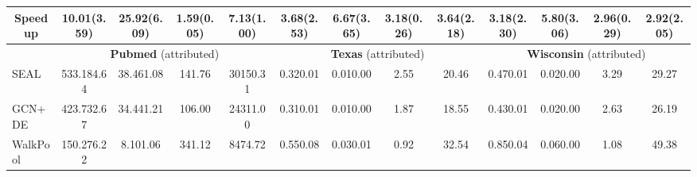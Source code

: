 \documentclass[sigconf, nonacm]{acmart}
\newcommand{\worst}{\cellcolor[rgb]{0.957,0.8,0.8}}
\newcommand{\best}{\cellcolor[rgb]{0.851,0.918,0.827}}
\begin{document}
\begin{table*}[h!]
{\begin{tabular}{l|cccc|cccc|cccc}
\hline
\multicolumn{1}{c}{Speedup} & 10.01(3.59)                                       & 25.92(6.09)                                     & 1.59(0.05)                                 & \multicolumn{1}{c}{7.13(1.00)}              & 3.68(2.53)                                       & 6.67(3.65)                                      & 3.18(0.26)                                & \multicolumn{1}{c}{3.64(2.18)}             & 3.18(2.30)                                        & 5.80(3.06)                                       & 2.96(0.29)                                 & 2.92(2.05)                                   \\ 
\hline
\multicolumn{1}{l|}{}       & \multicolumn{4}{c|}{\textbf{Pubmed }(attributed)}                                                                                                                                              & \multicolumn{4}{c|}{\textbf{Texas }(attributed)}                                                                                                                                            & \multicolumn{4}{c}{\textbf{Wisconsin }(attributed)}                                                                                                                                            \\ 
\hline
SEAL                        & \worst533.18{\scriptsize4.64}     & \worst38.46{\scriptsize1.08}    & 141.76                                     & \worst30150.31    & 0.32{\scriptsize0.01}                                      & \best0.01{\scriptsize0.00} & \worst2.55      & 20.46                                      & 0.47{\scriptsize0.01}                                      & \best0.02{\scriptsize0.00} & \worst3.29       & 29.27                                        \\
GCN+DE                      & 423.73{\scriptsize2.67}                                     & 34.44{\scriptsize1.21}                                    & \best106.00 & 24311.00                                    & \best0.31{\scriptsize0.01}  & 0.01{\scriptsize0.00}                                     & 1.87                                      & \best18.55  & \best0.43{\scriptsize0.01}  & 0.02{\scriptsize0.00}                                     & 2.63                                       & \best26.19    \\
WalkPool                    & \best150.27{\scriptsize6.22} & \best8.10{\scriptsize1.06} & \worst341.12     & \best8474.72 & \worst0.55{\scriptsize0.08}      & \worst0.03{\scriptsize0.01}     & \best0.92  & \worst32.54      & \worst0.85{\scriptsize0.04}      & \worst0.06{\scriptsize0.00}     & \best1.08   & \worst49.38        \\ 

\end{tabular}}
\end{table*}
\end{document}
